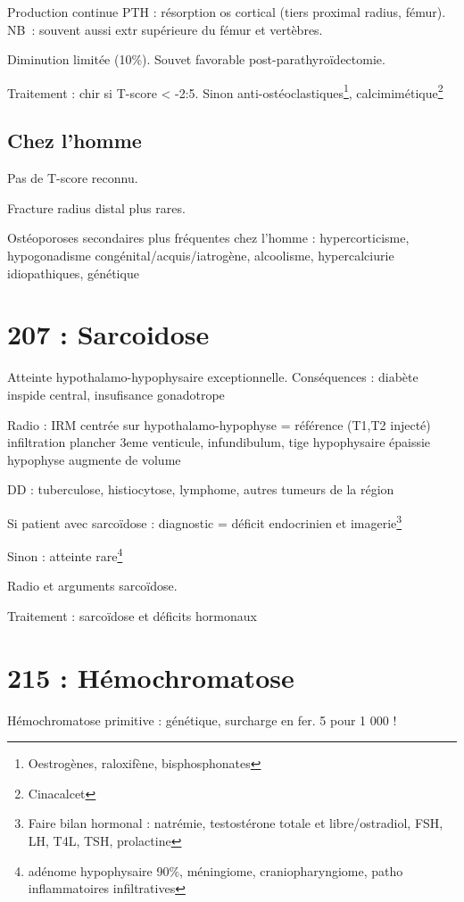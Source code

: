 \documentclass[11pt]{article}
\begin{document}
Production continue PTH : \inc résorption os cortical (tiers proximal radius,
fémur). NB : souvent aussi extr supérieure du fémur et vertèbres. 

Diminution limitée (10\%). Souvet favorable post-parathyroïdectomie.

Traitement : chir si T-score < -2:5. Sinon anti-ostéoclastiques\footnote{Oestrogènes, raloxifène, bisphosphonates}, calcimimétique\footnote{Cinacalcet}

\subsection{Chez l'homme}
\label{sec:orgf315057}
Pas de T-score reconnu. 

Fracture radius distal plus rares.

Ostéoporoses secondaires plus fréquentes chez l'homme : hypercorticisme,
hypogonadisme congénital/acquis/iatrogène, alcoolisme, hypercalciurie
idiopathiques, génétique
\section{207 : Sarcoidose}
\label{sec:org8eeaf68}
Atteinte hypothalamo-hypophysaire exceptionnelle. Conséquences : diabète
inspide central, insufisance gonadotrope

Radio : IRM centrée sur hypothalamo-hypophyse = référence (T1,T2 injecté) \thus
infiltration plancher 3eme venticule, infundibulum, tige hypophysaire épaissie
\textpm{} hypophyse augmente de volume

DD : tuberculose, histiocytose, lymphome, autres tumeurs de la région 

Si patient avec sarcoïdose : diagnostic = déficit endocrinien et imagerie\footnote{Faire bilan hormonal : natrémie, testostérone totale et libre/ostradiol,
FSH, LH, T4L, TSH, prolactine}

Sinon : atteinte rare\footnote{adénome hypophysaire 90\%, méningiome, craniopharyngiome, patho
inflammatoires infiltratives}

Radio et arguments sarcoïdose.

Traitement : sarcoïdose et déficits hormonaux

\section{215 : Hémochromatose}
\label{sec:org12f6b0c}
Hémochromatose primitive : génétique, surcharge en fer. 5 pour 1 000 !
\end{document}
